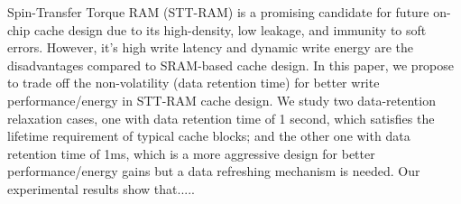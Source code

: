 Spin-Transfer Torque RAM (STT-RAM) is a promising candidate for future  
on-chip cache design due to its high-density, low leakage, and immunity to 
soft errors.  However, it's high write latency and dynamic
write energy are the disadvantages compared to SRAM-based cache design.
In this paper, we propose to trade off the non-volatility (data retention time)
for better write performance/energy in STT-RAM cache design. We study two
data-retention relaxation cases, one with data retention time of 1 second, which satisfies the lifetime requirement of typical cache blocks; and the other one with data retention time of 1ms, which is a more aggressive design for better performance/energy gains but a data refreshing mechanism is needed. Our 
experimental results show that.....